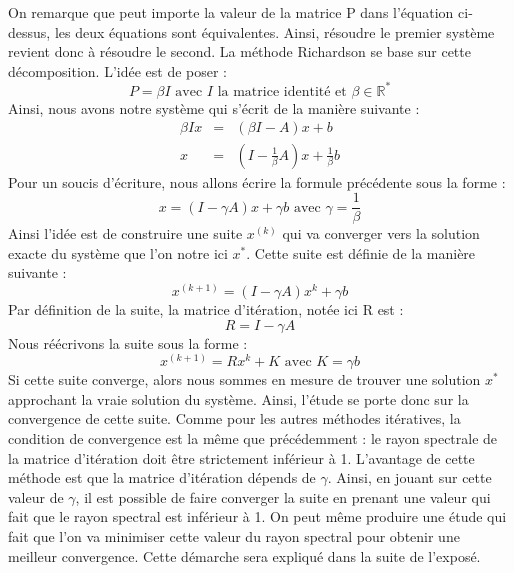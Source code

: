 On remarque que peut importe la valeur de la matrice P dans l'équation ci-dessus, les deux équations sont équivalentes. Ainsi, résoudre le premier système revient donc à résoudre le second. La méthode Richardson se base sur cette décomposition. L'idée est de poser : 
\begin{equation}
	P = \beta I \text{ avec $I$ la matrice identité et $\beta \in \mathbb{R}^*$}
\end{equation}
Ainsi, nous avons notre système qui s'écrit de la manière suivante : 
\begin{eqnarray}
\beta Ix &=& (\beta I - A)x + b\\
x &=& (I - \frac{1}{\beta} A)x + \frac{1}{\beta}b
\end{eqnarray}
Pour un soucis d'écriture, nous allons écrire la formule précédente sous la forme : 
\begin{equation}
x = (I - \gamma A)x + \gamma b \text{ avec $\gamma = \frac{1}{\beta}$}
\end{equation}
Ainsi l'idée est de construire une suite $x^{(k)}$ qui va converger vers la solution exacte du système que l'on notre ici $x^*$. Cette suite est définie de la manière suivante : 
\begin{equation}
x^{(k+1)} = (I - \gamma A)x^{k} + \gamma b
\end{equation}
Par définition de la suite, la matrice d'itération, notée ici R est : 
\begin{equation}
R = I - \gamma A \label{R}
\end{equation}
Nous réécrivons la suite sous la forme : 
\begin{equation}
x^{(k+1)} = Rx^{k} + K \text{ avec $K = \gamma b$}
\end{equation}
Si cette suite converge, alors nous sommes en mesure de trouver une solution $x^*$ approchant la vraie solution du système. Ainsi, l'étude se porte donc sur la convergence de cette suite. Comme pour les autres méthodes itératives, la condition de convergence est la même que précédemment : le rayon spectrale de la matrice d'itération doit être strictement inférieur à 1. L'avantage de cette méthode est que la matrice d'itération dépends de $\gamma$. Ainsi, en jouant sur cette valeur de $\gamma$, il est possible de faire converger la suite en prenant une valeur qui fait que le rayon spectral est inférieur à 1. On peut même produire une étude qui fait que l'on va minimiser cette valeur du rayon spectral pour obtenir une meilleur convergence. Cette démarche sera expliqué dans la suite de l'exposé.
 
